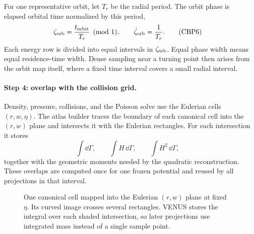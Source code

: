 For one representative orbit, let \(T_r\) be the radial period.  The orbit
phase is elapsed orbital time normalized by this period,
\[
  \zeta_{\rm orb}=\frac{t_{\rm orbit}}{T_r}\pmod 1,
  \qquad \dot\zeta_{\rm orb}=\frac{1}{T_r}.             \tag{CBP6}
\]
Each energy row is divided into equal intervals in \(\zeta_{\rm orb}\).
Equal phase width means equal residence-time width.  Dense sampling near a
turning point then arises from the orbit map itself, where a fixed time
interval covers a small radial interval.

\paragraph{Step 4: overlap with the collision grid.}

Density, pressure, collisions, and the Poisson solve use the Eulerian cells
\((r,w,\eta)\).  The atlas builder traces the boundary of each canonical cell
into the \((r,w)\) plane and intersects it with the Eulerian rectangles.  For
each intersection it stores
\[
  \int\dd\Gamma,\qquad
  \int H\,\dd\Gamma,\qquad
  \int H^2\,\dd\Gamma,                                  \tag{CBP7}
\]
together with the geometric moments needed by the quadratic reconstruction.
These overlaps are computed once for one frozen potential and reused by all
projections in that interval.

\begin{figure}[ht]
\centering
{}
\caption{One canonical cell mapped into the Eulerian \((r,w)\) plane at fixed
\(\eta\).  Its curved image crosses several rectangles.  VENUS stores the
integral over each shaded intersection, so later projections use integrated
mass instead of a single sample point.}
\label{fig:canonical-atlas-overlap}
\end{figure}

